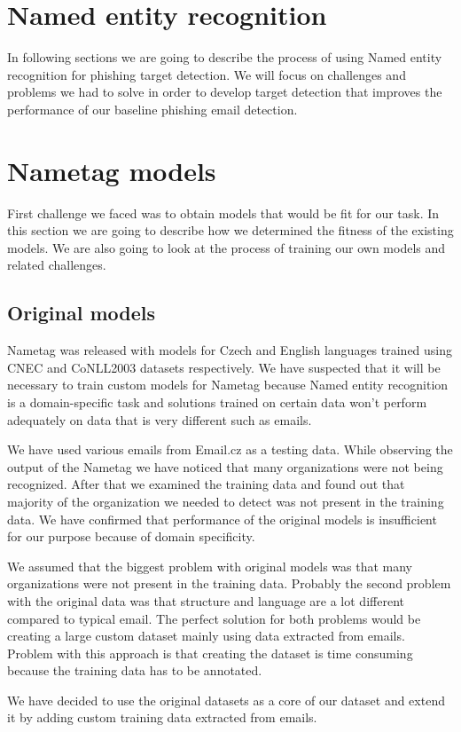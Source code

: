 \documentclass[thesis=B,english]{FITthesis}[2012/10/20]
\begin{document}
\section{Named entity recognition}
In following sections we are going to describe the process of using Named entity recognition for phishing target detection. We will focus on challenges and problems we had to solve in order to develop target detection that improves the performance of our baseline phishing email detection.

\section{Nametag models}
First challenge we faced was to obtain models that would be fit for our task. In this section we are going to describe how we determined the fitness of the existing models. We are also going to look at the process of training our own models and related challenges. 
\subsection{Original models}
\par Nametag was released with models for Czech and English languages trained using CNEC and CoNLL2003 datasets respectively. We have suspected that it will be necessary to train custom models for Nametag because Named entity recognition is a domain-specific task and solutions trained on certain data won't perform adequately on data that is very different such as emails. \cite{twitterNER}

\par We have used various emails from Email.cz as a testing data.
While observing the output of the Nametag we have noticed that many organizations were not being recognized.
After that we examined the training data and found out that majority of the organization we needed to detect was not present in the training data. 
We have confirmed that performance of the original models is insufficient for our purpose because of domain specificity.

\par We assumed that the biggest problem with original models was that many organizations were not present in the training data.
Probably the second problem with the original data was that structure and language are a lot different compared to typical email.
The perfect solution for both problems would be creating a large custom dataset mainly using data extracted from emails. 
Problem with this approach is that creating the dataset is time consuming because the training data has to be annotated. 
\par We have decided to use the original datasets as a core of our dataset and extend it by adding custom training data extracted from emails.
\end{document}
